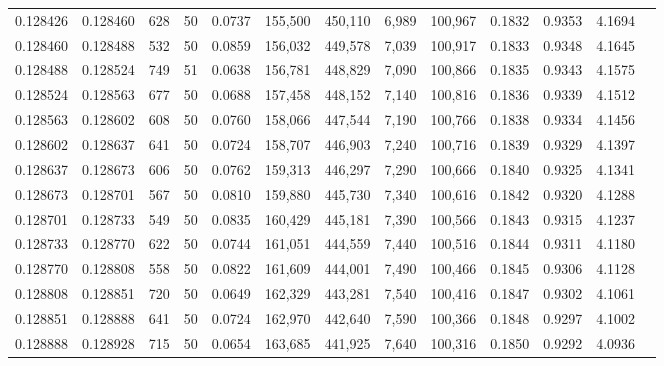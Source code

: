 \begin{tabular}{rrrrrrrrrrrrr}
0.128426 & 0.128460 &   628 &  50 &                                     0.0737 & 155,500 & 450,110 &   6,989 & 100,967 & 0.1832 & 0.9353 & 4.1694 \\
0.128460 & 0.128488 &   532 &  50 &                                     0.0859 & 156,032 & 449,578 &   7,039 & 100,917 & 0.1833 & 0.9348 & 4.1645 \\
0.128488 & 0.128524 &   749 &  51 &                                     0.0638 & 156,781 & 448,829 &   7,090 & 100,866 & 0.1835 & 0.9343 & 4.1575 \\
0.128524 & 0.128563 &   677 &  50 &                                     0.0688 & 157,458 & 448,152 &   7,140 & 100,816 & 0.1836 & 0.9339 & 4.1512 \\
0.128563 & 0.128602 &   608 &  50 &                                     0.0760 & 158,066 & 447,544 &   7,190 & 100,766 & 0.1838 & 0.9334 & 4.1456 \\
0.128602 & 0.128637 &   641 &  50 &                                     0.0724 & 158,707 & 446,903 &   7,240 & 100,716 & 0.1839 & 0.9329 & 4.1397 \\
0.128637 & 0.128673 &   606 &  50 &                                     0.0762 & 159,313 & 446,297 &   7,290 & 100,666 & 0.1840 & 0.9325 & 4.1341 \\
0.128673 & 0.128701 &   567 &  50 &                                     0.0810 & 159,880 & 445,730 &   7,340 & 100,616 & 0.1842 & 0.9320 & 4.1288 \\
0.128701 & 0.128733 &   549 &  50 &                                     0.0835 & 160,429 & 445,181 &   7,390 & 100,566 & 0.1843 & 0.9315 & 4.1237 \\
0.128733 & 0.128770 &   622 &  50 &                                     0.0744 & 161,051 & 444,559 &   7,440 & 100,516 & 0.1844 & 0.9311 & 4.1180 \\
0.128770 & 0.128808 &   558 &  50 &                                     0.0822 & 161,609 & 444,001 &   7,490 & 100,466 & 0.1845 & 0.9306 & 4.1128 \\
0.128808 & 0.128851 &   720 &  50 &                                     0.0649 & 162,329 & 443,281 &   7,540 & 100,416 & 0.1847 & 0.9302 & 4.1061 \\
0.128851 & 0.128888 &   641 &  50 &                                     0.0724 & 162,970 & 442,640 &   7,590 & 100,366 & 0.1848 & 0.9297 & 4.1002 \\
0.128888 & 0.128928 &   715 &  50 &                                     0.0654 & 163,685 & 441,925 &   7,640 & 100,316 & 0.1850 & 0.9292 & 4.0936 \\

\end{tabular}

